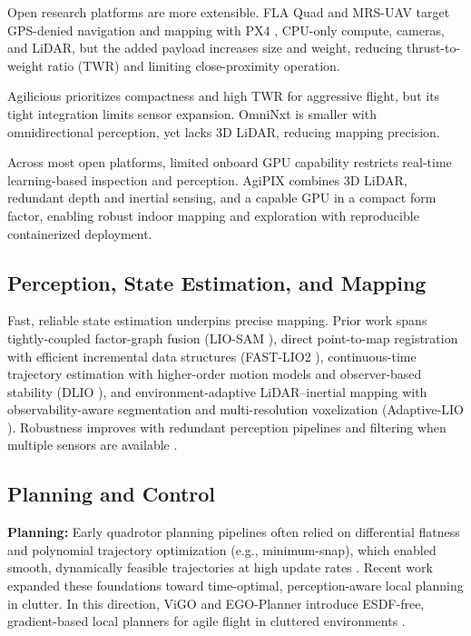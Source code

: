 \documentclass[letterpaper, 10 pt, conference]{ieeeconf}  %
\newcommand{\Agipixs}{AgiPIX }
\begin{document}
Open research platforms are more extensible. FLA Quad \cite{Mohta18jfr} and MRS-UAV \cite{Baca2021jirs} target GPS-denied navigation and mapping with PX4 \cite{meier2015px4}, CPU-only compute, cameras, and LiDAR, but the added payload increases size and weight, reducing thrust-to-weight ratio (TWR) and limiting close-proximity operation.

Agilicious \cite{Foehn2022Agilicious} prioritizes compactness and high TWR for aggressive flight, but its tight integration limits sensor expansion. OmniNxt \cite{liu2024omninxt} is smaller with omnidirectional perception, yet lacks 3D LiDAR, reducing mapping precision.

Across most open platforms, limited onboard GPU capability restricts real-time learning-based inspection and perception. \Agipixs combines 3D LiDAR, redundant depth and inertial sensing, and a capable GPU in a compact form factor, enabling robust indoor mapping and exploration with reproducible containerized deployment.
%
\subsection{Perception, State Estimation, and Mapping}\label{subsec:related.perception}
Fast, reliable state estimation underpins precise mapping. Prior work spans tightly-coupled factor-graph fusion (LIO-SAM \cite{shan2020lio}), direct point-to-map registration with efficient incremental data structures (FAST-LIO2 \cite{xu2022fast}), continuous-time trajectory estimation with higher-order motion models and observer-based stability (DLIO \cite{chen2022dlio}), and environment-adaptive LiDAR--inertial mapping with observability-aware segmentation and multi-resolution voxelization (Adaptive-LIO \cite{zhao2024adaptive}). Robustness improves with redundant perception pipelines and filtering when multiple sensors are available \cite{kuruppu2024robust}.

\subsection{Planning and Control}\label{subsec:related.planning}
\textbf{Planning:} Early quadrotor planning pipelines often relied on differential flatness and polynomial trajectory optimization (e.g., minimum-snap), which enabled smooth, dynamically feasible trajectories at high update rates \cite{mellinger2011minsnap}. Recent work expanded these foundations toward time-optimal, perception-aware local planning in clutter. In this direction, ViGO and EGO-Planner introduce ESDF-free, gradient-based local planners for agile flight in cluttered environments \cite{xuVigoPlanner2026, zhou2021egoplanner}. 
\end{document}
